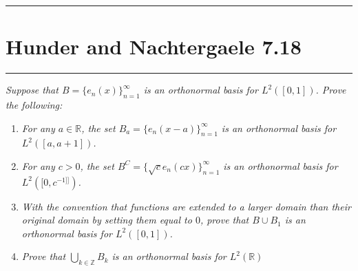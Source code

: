 \documentclass{article} %
\theoremstyle{plain}
\def\Rl{\mathbb{R}}
\newcommand{\problem}[1]{
\vspace{.375cm}
\begin{minipage}{\textwidth}
    \begin{center}
        \noindent\rule{5cm}{1pt}
    \end{center}
    \section{\bf #1}
    \begin{center}
        \noindent\rule{5cm}{1pt}
    \end{center}
    \vspace{0.25cm}
\end{minipage}
}
\numberwithin{equation}{section} %
\numberwithin{figure}{section} %
\numberwithin{table}{section} %
\begin{document}
\problem{Hunder and Nachtergaele 7.18}
\emph{Suppose that $B = \{e_n(x)\}_{n=1}^\infty$ is an orthonormal basis for $L^2([0,1])$.  Prove the following:}
\begin{enumerate}[ (a)]
    \item
        \emph{For any $a \in \Rl$, the set $B_a = \{e_n(x - a)\}_{n=1}^\infty$ is an orthonormal basis for $L^2([a, a+1])$.}
    \item
        \emph{For any $c > 0$, the set $B^C = \{\sqrt{c}e_n(cx)\}_{n=1}^\infty$ is an orthonormal basis for $L^2([0, c^{-1]]})$.}
    \item
        \emph{With the convention that functions are extended to a larger domain than their original domain by setting them equal to $0$, prove that $B \cup B_1$ is an orthonormal basis for $L^2([0,1])$.}
    \item
        \emph{Prove that $\bigcup_{k\in\mathbb{Z}} B_k$ is an orthonormal basis for $L^2(\Rl)$}
\end{enumerate}
\end{document}

